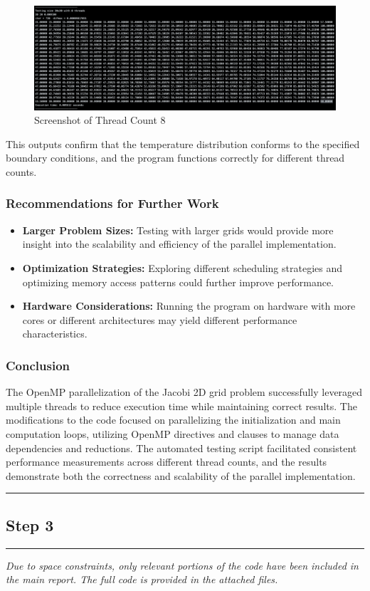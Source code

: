 \documentclass{article}
\begin{document}
\begin{figure}[H]
    \centering
    \includegraphics[width=\linewidth]{Images/Thread8.png}
    \caption{Screenshot of Thread Count 8}
    \label{fig:thread8}
\end{figure}

This outputs confirm that the temperature distribution conforms to the specified boundary conditions, and the program functions correctly for different thread counts.

\subsubsection{Recommendations for Further Work}

\begin{itemize}
    \item \textbf{Larger Problem Sizes:} Testing with larger grids would provide more insight into the scalability and efficiency of the parallel implementation.
    \item \textbf{Optimization Strategies:} Exploring different scheduling strategies and optimizing memory access patterns could further improve performance.
    \item \textbf{Hardware Considerations:} Running the program on hardware with more cores or different architectures may yield different performance characteristics.
\end{itemize}

\subsubsection{Conclusion}

The OpenMP parallelization of the Jacobi 2D grid problem successfully leveraged multiple threads to reduce execution time while maintaining correct results. The modifications to the code focused on parallelizing the initialization and main computation loops, utilizing OpenMP directives and clauses to manage data dependencies and reductions. The automated testing script facilitated consistent performance measurements across different thread counts, and the results demonstrate both the correctness and scalability of the parallel implementation.

\rule{\linewidth}{0.5pt}

\subsection{Step 3}



\printbibliography

\hrule

\textit{Due to space constraints, only relevant portions of the code have been included in the main report. The full code is provided in the attached files.}
\end{document}
